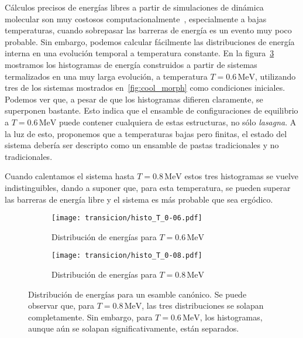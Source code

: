 Cálculos precisos de energías libres a partir de simulaciones de dinámica molecular son muy costosos computacionalmente~\cite[pp. 167-200]{frenkel_understanding_2001}, especialmente a bajas temperaturas, cuando sobrepasar las barreras de energía es un evento muy poco probable.
Sin embargo, podemos calcular fácilmente las distribuciones de energía interna en una evolución temporal a temperatura constante.
En la figura~\ref{fig:histo} mostramos los histogramas de energía construidos a partir de sistemas termalizados en una muy larga evolución, a temperatura $T=0.6\,\text{MeV}$, utilizando tres de los sistemas mostrados en~\ref{fig:cool_morph} como condiciones iniciales.
Podemos ver que, a pesar de que los histogramas difieren claramente, se superponen bastante.
Esto indica que el ensamble de configuraciones de equilibrio a $T=0.6\,\text{MeV}$ puede contener cualquiera de estas estructuras, no sólo \emph{lasagna}.
A la luz de esto, proponemos que a temperaturas bajas pero finitas, el estado del sistema debería ser descripto como un ensamble de pastas tradicionales y no tradicionales.

Cuando calentamos el sistema hasta $T=0.8\,\text{MeV}$ estos tres histogramas se vuelve indistinguibles, dando a suponer que, para esta temperatura, se pueden superar las barreras de energía libre y el sistema es más probable que sea ergódico.

\begin{figure}[floatfix]%
  \centering
  \begin{subfigure}[h!]{0.4\columnwidth}
    \texttt{[image: transicion/histo\_T\_0-06.pdf]}
    \caption{Distribución de energías para $T=0.6\,\text{MeV}$}
\label{subfig:histo_T_0-06}
  \end{subfigure}
  \begin{subfigure}[h!]{0.4\columnwidth}
    \texttt{[image: transicion/histo\_T\_0-08.pdf]}
    \caption{Distribución de energías para $T=0.8\,\text{MeV}$}
\label{subfig:histo_T_0-08}
  \end{subfigure}
  \caption{Distribución de energías para un esamble canónico.
    Se puede observar que, para $T=0.8\,\text{MeV}$, las tres distribuciones se solapan completamente.
    Sin embargo, para $T=0.6\,\text{MeV}$, los histogramas, aunque aún se solapan significativamente, están separados.}
\label{fig:histo}
\end{figure}

